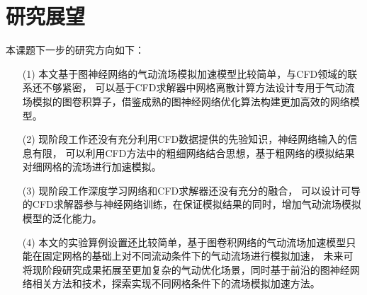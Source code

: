 \section{研究展望}

本课题下一步的研究方向如下：
\begin{itemize}
	\item[(1)] 本文基于图神经网络的气动流场模拟加速模型比较简单，与CFD领域的联系还不够紧密，
	可以基于CFD求解器中网格离散计算方法设计专用于气动流场模拟的图卷积算子，借鉴成熟的图神经网络优化算法构建更加高效的网络模型。
	
	\item[(2)] 现阶段工作还没有充分利用CFD数据提供的先验知识，神经网络输入的信息有限，
	可以利用CFD方法中的粗细网络结合思想，基于粗网络的模拟结果对细网格的流场进行加速模拟。
	
	\item[(3)] 现阶段工作深度学习网络和CFD求解器还没有充分的融合，
	可以设计可导的CFD求解器参与神经网络训练，在保证模拟结果的同时，增加气动流场模拟模型的泛化能力。	

	\item[(4)] 本文的实验算例设置还比较简单，基于图卷积网络的气动流场加速模型只能在固定网格的基础上对不同流动条件下的气动流场进行模拟加速，
	未来可将现阶段研究成果拓展至更加复杂的气动优化场景，同时基于前沿的图神经网络相关方法和技术，探索实现不同网格条件下的流场模拟加速方法。
	
\end{itemize}
	
	